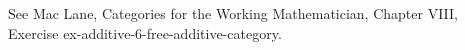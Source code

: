 See Mac Lane, Categories for the Working Mathematician, Chapter VIII, Exercise ex-additive-6-free-additive-category.
